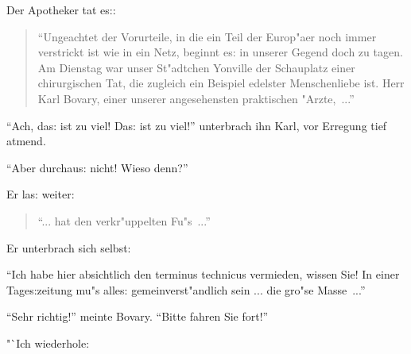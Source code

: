 \documentclass[oneside,12pt]{book}
\newenvironment{antiqua}{\normalfont}{}%
\newcommand{\s}{s:}%
\begin{document}
Der Apotheker tat e{\s}:

\begin{quotation}\noindent
"`Ungeachtet der Vorurteile, in die ein Teil der Europ"aer noch
immer verstrickt ist wie in ein Netz, beginnt e{\s} in unserer
Gegend doch zu tagen. Am Dienstag war unser St"adtchen Yonville
der Schauplatz einer chirurgischen Tat, die zugleich ein Beispiel
edelster Menschenliebe ist. Herr Karl Bovary, einer unserer
angesehensten praktischen "Arzte,~..."'
\end{quotation}

"`Ach, da{\s} ist zu viel! Da{\s} ist zu viel!"' unterbrach ihn
Karl, vor Erregung tief atmend.

"`Aber durchau{\s} nicht! Wieso denn?"'

Er la{\s} weiter:

\begin{quotation}\noindent
"`... hat den verkr"uppelten Fu"s~..."'
\end{quotation}

Er unterbrach sich selbst:

"`Ich habe hier absichtlich den \begin{antiqua}terminus
technicus\end{antiqua} vermieden, wissen Sie! In einer
Tage{\s}zeitung mu"s alle{\s} gemeinverst"andlich sein ... die
gro"se Masse~..."'

"`Sehr richtig!"' meinte Bovary. "`Bitte fahren Sie fort!"'

"`Ich wiederhole:
\end{document}
